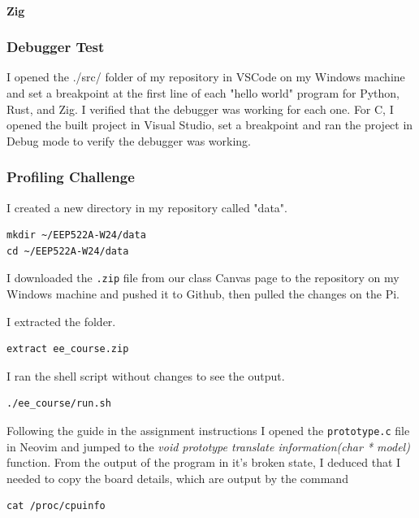 \documentclass[12pt]{article}
\begin{document}
\paragraph{Zig}

\subsubsection{Debugger Test}
I opened the ./src/ folder of my repository in VSCode on my Windows machine and set a breakpoint at the first line of each "hello world" program for Python, Rust, and Zig. I verified that the debugger was working for each one. For C, I opened the built project in Visual Studio, set a breakpoint and ran the project in Debug mode to verify the debugger was working.

\subsubsection{Profiling Challenge}

I created a new directory in my repository called "data".

\begin{lstlisting}
mkdir ~/EEP522A-W24/data
cd ~/EEP522A-W24/data
\end{lstlisting}

I downloaded the \verb|.zip| file from our class Canvas page to the repository on my Windows machine and pushed it to Github, then pulled the changes on the Pi.

I extracted the folder.

\begin{lstlisting}
extract ee_course.zip
\end{lstlisting}

I ran the shell script without changes to see the output.

\begin{lstlisting}
./ee_course/run.sh
\end{lstlisting}

Following the guide in the assignment instructions I opened the \verb|prototype.c| file in Neovim and jumped to the \textit{void prototype translate information(char * model)}  function. From the output of the program in it's broken state, I deduced that I needed to copy the board details, which are output by the command

\begin{lstlisting}
cat /proc/cpuinfo
\end{lstlisting}
\end{document}

